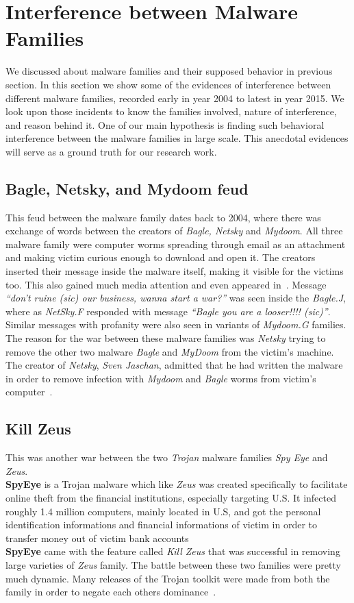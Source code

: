 \section{Interference between Malware Families}
\label{sec:Interference between Malware Families}
We discussed about malware families and their supposed behavior in previous section.
In this section we show some of the evidences of interference between different malware families, recorded early in year 2004 to latest in year 2015.
We look upon those incidents to know the families involved, nature of interference, and reason behind it.
One of our main hypothesis is finding such behavioral interference between the malware families in large scale.
This anecdotal evidences will serve as a ground truth for our research work.
\subsection{Bagle, Netsky, and Mydoom feud}
\label{sub:Bagle, Netsky, and Mydoom feud}
This feud between the malware family dates back to 2004, where there was exchange of words between the creators of \emph{Bagle, Netsky} and \emph{Mydoom}.
All three malware family were computer worms spreading through email as an attachment and making victim curious enough to download and open it.
The creators inserted their message inside the malware itself, making it visible for the victims too. This also gained much media attention and even appeared in~\cite[BBC]{bbccover}.
Message \emph{``don't ruine (sic) our business, wanna start a war?''} was seen inside the \emph{Bagle.J}, where as \emph{NetSky.F} responded with message \emph{``Bagle \- you are a looser!!!! (sic)''}.
Similar messages with profanity were also seen in variants of \emph{Mydoom.G} families.\\
The reason for the war between these malware families was \emph{Netsky} trying to remove the other two malware \emph{Bagle} and \emph{MyDoom} from the victim's machine.
The creator of \emph{Netsky}, \emph{Sven Jaschan}, admitted that he had written the malware in order to remove infection with \emph{Mydoom} and \emph{Bagle} worms from victim's computer~\cite[]{wikinetsky}.\\
\subsection{Kill Zeus}
\label{sub:Kill Zeus}
This was another war between the two \emph{Trojan} malware families \emph{Spy Eye} and \emph{Zeus}.\\
\textbf{SpyEye} is a Trojan malware which like \emph{Zeus} was created specifically to facilitate online theft from the financial institutions, especially targeting U.S.
It infected roughly 1.4 million computers, mainly located in U.S, and got the personal identification informations and financial informations of victim in order to transfer money out of victim bank accounts~\cite[]{fbispyeye} \\
\textbf{SpyEye} came with the feature called \emph{Kill Zeus} that was successful in removing large varieties of \emph{Zeus} family.
The battle between these two families were pretty much dynamic.
Many releases of the Trojan toolkit were made from both the family in order to negate each others dominance~\cite[]{sanszeus}.
